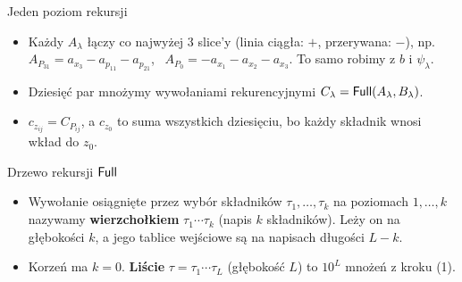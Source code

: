 \begin{frame}{Jeden poziom rekursji}
  \vspace{0.3em}
  \begin{itemize}\footnotesize
    \item<2-> Każdy $A_\lambda$ łączy co najwyżej 3 slice'y (linia ciągła: $+$, przerywana: $-$), np.
      $A_{P_{31}}=a_{x_3}-a_{p_{11}}-a_{p_{21}}$, \ $A_{P_0}=-a_{x_1}-a_{x_2}-a_{x_3}$. To samo robimy z $b$ i $\psi_\lambda$.
    \item<3-> Dziesięć par mnożymy wywołaniami rekurencyjnymi $C_\lambda=\mathsf{Full}(A_\lambda,B_\lambda)$.
    \item<4-> $c_{z_{ij}}=C_{P_{ij}}$, a $c_{z_0}$ to suma wszystkich dziesięciu, bo każdy składnik wnosi wkład do $z_0$.
  \end{itemize}
\end{frame}

\begin{frame}{Drzewo rekursji $\mathsf{Full}$}
  \begin{itemize}
    \item Wywołanie osiągnięte przez wybór składników $\tau_1,\dots,\tau_k$ na poziomach $1,\dots,k$ nazywamy
      \textbf{wierzchołkiem} $\tau_1\cdots\tau_k$ (napis $k$ składników). Leży on na głębokości $k$,
      a jego tablice wejściowe są na napisach długości $L-k$.
    \item Korzeń ma $k=0$. \textbf{Liście} $\tau=\tau_1\cdots\tau_L$ (głębokość $L$) to $10^L$ mnożeń z kroku (1).
  \end{itemize}
  \centering
\end{frame}

